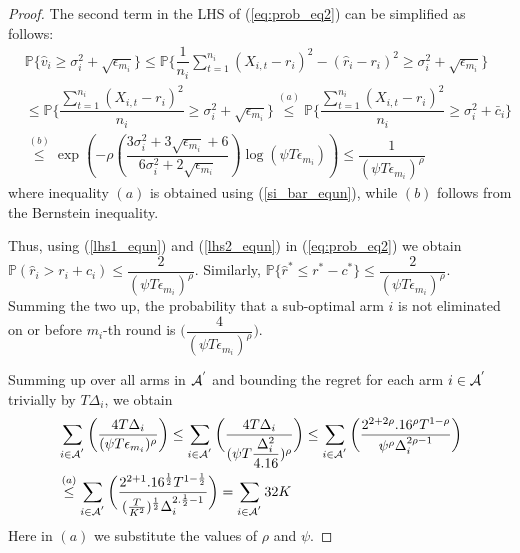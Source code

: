 \begin{proof}
 
The second term in the LHS of (\ref{eq:prob_eq2}) can be simplified as follows:
\begin{align}
&\mathbb{P}\bigg\lbrace \hat{v}_{i}\geq \sigma_{i}^{2}+\sqrt{\epsilon_{m_{i}}}\bigg\rbrace\nonumber
\leq \mathbb{P}\bigg\lbrace \dfrac{1}{n_{i}}\sum_{t=1}^{n_{i}}(X_{i,t}-r_{i})^{2}-(\hat{r}_{i}-r_{i})^{2}\geq \sigma_{i}^{2}+\sqrt{\epsilon_{m_{i}}}\bigg\rbrace\nonumber\\
&\leq \mathbb{P}\bigg\lbrace \dfrac{\sum_{t=1}^{n_{i}}(X_{i,t}-r_{i})^{2}}{n_{i}}\geq \sigma_{i}^{2}+\sqrt{\epsilon_{m_{i}}} \bigg\rbrace\nonumber
\overset{(a)}{\leq} \mathbb{P}\bigg\lbrace \dfrac{\sum_{t=1}^{n_{i}}(X_{i,t}-r_{i})^{2}}{n_{i}}\geq \sigma_{i}^{2} + \bar{c}_i\bigg\rbrace \nonumber\\
&\overset{(b)}{\leq} \exp\left(- \rho \left(\dfrac{3\sigma_{i}^{2}+3\sqrt{\epsilon_{m_{i}}} + 6}{6\sigma_i^2 + 2\sqrt{\epsilon_{m_i}}} \right)\log(\psi  T\epsilon_{m_{i}})\right)
\le \dfrac{1}{(\psi  T\epsilon_{m_{i}})^{\rho}}
\label{lhs2_equn}
\end{align}
where inequality $(a)$ is obtained using (\ref{si_bar_equn}), while $(b)$ follows from the Bernstein inequality.
  
Thus, using (\ref{lhs1_equn}) and (\ref{lhs2_equn}) in (\ref{eq:prob_eq2}) we obtain $\mathbb{P}(\hat{r}_{i}> r_{i} + c_{i})\le \dfrac{2}{(\psi  T\epsilon_{m_{i}})^{\rho}}$. Similarly, $\mathbb{P}\lbrace\hat{r}^{*}\leq r^{*} - c^{*}\rbrace \leq \dfrac{2}{(\psi  T\epsilon_{m_{i}})^{\rho}}$. Summing the two up, the probability that a sub-optimal arm ${i}$ is not eliminated on or before $m_{i}$-th round is  $\bigg(\dfrac{4}{(\psi T\epsilon_{m_{i}})^{\rho}} \bigg)$.

Summing up over all arms in $\mathcal{A}^{'}$ and bounding the regret for each arm $i\in \mathcal{A}^{'}$ trivially by $T\Delta_{i}$, we obtain
   \begin{align*}
&\sum_{i\in \mathcal{A}^{'}}\bigg(\dfrac{4T\Delta_{i}}{(\psi T\epsilon_{m_{i}})^{\rho}}\bigg)
\leq\sum_{i\in \mathcal{A}^{'}}\bigg(\dfrac{4T\Delta_{i}}{(\psi T\dfrac{\Delta_{i}^{2}}{4.16})^{\rho}}\bigg)
\leq \sum_{i\in \mathcal{A}^{'}}\bigg(\dfrac{2^{2+2\rho}.16^{\rho}T^{1-\rho}}{\psi^{\rho}\Delta_{i}^{2\rho -1}}\bigg)\\  
& \overset{(a)}{\leq} \sum_{i\in \mathcal{A}^{'}}\bigg(\dfrac{2^{2+1}.16^{\frac{1}{2}}T^{1-\frac{1}{2}}}{(\frac{T}{K^2})^{\frac{1}{2}}\Delta_{i}^{2.\frac{1}{2} -1}}\bigg) = \sum_{i\in \mathcal{A}^{'}}  32 K  
   \end{align*}
   Here in $(a)$ we substitute the values of $\rho$ and $\psi$.


\end{proof}
